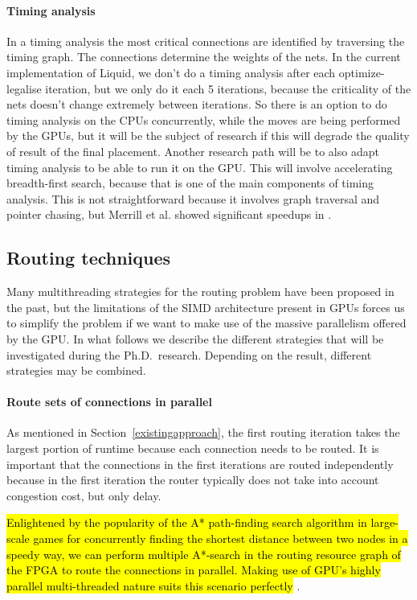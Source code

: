 \documentclass[a4paper,oneside,12pt]{article}
\begin{document}
\paragraph{Timing analysis}
In a timing analysis the most critical connections are identified by traversing the timing graph. The connections determine the weights of the nets.
In the current implementation of {\sc Liquid}, we don't do a timing analysis after each optimize-legalise iteration, but we only do it each 5 iterations, because the criticality of the nets doesn't change extremely between iterations.
So there is an option to do timing analysis on the CPUs concurrently, while the moves are being performed by the GPUs, but it will be the subject of research if this will degrade the quality of result of the final placement.
Another research path will be to also adapt timing analysis to be able to run it on the GPU. This will involve accelerating breadth-first search, because that is one of the main components of timing analysis. This is not straightforward because it involves graph traversal and pointer chasing, but Merrill et al. showed significant speedups in \cite{Merrill2015}.



\subsection{Routing techniques}\label{routetech}

Many multithreading strategies for the routing problem have been proposed in the past, but the limitations of the SIMD architecture present in GPUs forces us to simplify the problem if we want to make use of the massive parallelism offered by the GPU.
In what follows we describe the different strategies that will be investigated during the Ph.D.\ research. Depending on the result, different strategies may be combined.

\paragraph{Route sets of connections in parallel}
As mentioned in Section~\ref{existingapproach}, the first routing iteration takes the largest portion of runtime because each connection needs to be routed.
It is important that the connections in the first iterations are routed independently because in the first iteration the router typically does not take into account congestion cost, but only delay.

\hl{Enlightened by the popularity of the A* path-finding search algorithm in large-scale games for concurrently finding the shortest distance between two nodes in a speedy way, we can perform multiple A*-search in the routing resource graph of the FPGA to route the connections in parallel. Making use of GPU's highly parallel multi-threaded nature suits this scenario perfectly} \cite{bleiweiss2008gpu,bleiweiss2012system}.
\end{document}
